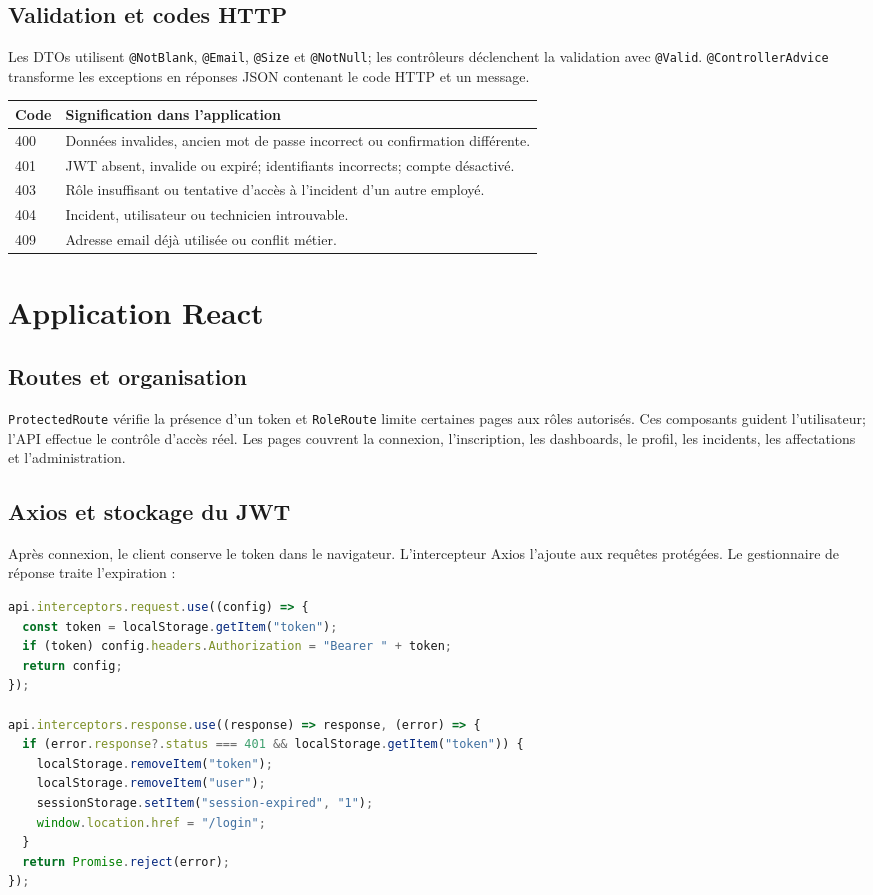 \documentclass[12pt,a4paper,oneside]{report}
\begin{document}
\section{Validation et codes HTTP}
Les DTOs utilisent \texttt{@NotBlank}, \texttt{@Email}, \texttt{@Size} et \texttt{@NotNull}; les contrôleurs déclenchent la validation avec \texttt{@Valid}. \texttt{@ControllerAdvice} transforme les exceptions en réponses JSON contenant le code HTTP et un message.

\begin{longtable}{p{2cm}p{11cm}}
\toprule
\textbf{Code} & \textbf{Signification dans l'application}\\
\midrule
400 & Données invalides, ancien mot de passe incorrect ou confirmation différente.\\
401 & JWT absent, invalide ou expiré; identifiants incorrects; compte désactivé.\\
403 & Rôle insuffisant ou tentative d'accès à l'incident d'un autre employé.\\
404 & Incident, utilisateur ou technicien introuvable.\\
409 & Adresse email déjà utilisée ou conflit métier.\\
\bottomrule
\end{longtable}

\chapter{Application React}
\section{Routes et organisation}
\texttt{ProtectedRoute} vérifie la présence d'un token et \texttt{RoleRoute} limite certaines pages aux rôles autorisés. Ces composants guident l'utilisateur; l'API effectue le contrôle d'accès réel. Les pages couvrent la connexion, l'inscription, les dashboards, le profil, les incidents, les affectations et l'administration.

\section{Axios et stockage du JWT}
Après connexion, le client conserve le token dans le navigateur. L'intercepteur Axios l'ajoute aux requêtes protégées. Le gestionnaire de réponse traite l'expiration :

\begin{lstlisting}[language=JavaScript,caption={Intercepteurs Axios}]
api.interceptors.request.use((config) => {
  const token = localStorage.getItem("token");
  if (token) config.headers.Authorization = "Bearer " + token;
  return config;
});

api.interceptors.response.use((response) => response, (error) => {
  if (error.response?.status === 401 && localStorage.getItem("token")) {
    localStorage.removeItem("token");
    localStorage.removeItem("user");
    sessionStorage.setItem("session-expired", "1");
    window.location.href = "/login";
  }
  return Promise.reject(error);
});
\end{lstlisting}
\end{document}
